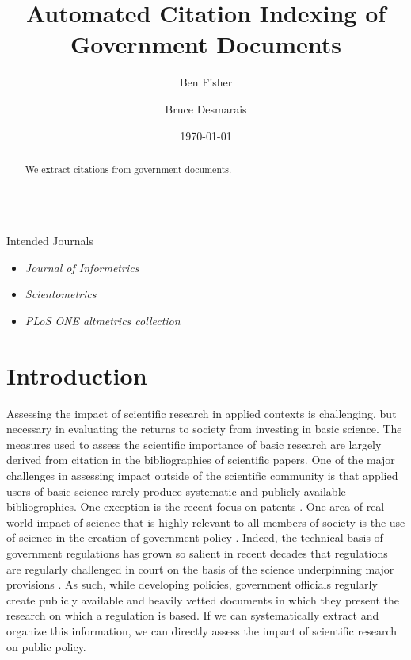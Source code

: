 \documentclass[12pt]{article}
\title{\vspace{-2cm} Automated Citation Indexing of Government Documents}
\author{ Ben Fisher \and Bruce Desmarais} \date{\today}
\begin{document}
\maketitle


\begin{abstract}

 \noindent  We extract citations from government documents. \\~\\

\end{abstract}

Intended Journals \begin{itemize}
\item {\em Journal of Informetrics}
\item {\em Scientometrics}
\item {\em PLoS ONE altmetrics collection}
\end{itemize}

\thispagestyle{empty}
\newpage
\doublespacing


\section{Introduction}
Assessing the impact of scientific research in applied contexts is challenging, but necessary in evaluating the returns to society from investing in basic science. The measures used to assess the scientific importance of basic research are largely derived from citation in the bibliographies of scientific papers. One of the major challenges in assessing impact outside of the scientific community is that applied users of basic science rarely produce systematic and publicly available bibliographies. One exception is the recent focus on patents \cite{huang2014,liaw2014,huang2015,wong2015}. One area of real-world impact of science that is highly relevant to all members of society is the use of science in the creation of government policy \cite{nrc2012}. Indeed, the technical basis of government regulations has grown so salient in recent decades that regulations are regularly challenged in court on the basis of the science underpinning major provisions \cite{ellig2013,morrall2014}. As such, while developing policies, government officials regularly create publicly available and heavily vetted documents in which they present the research on which a regulation is based. If we can systematically extract and organize this information, we can directly assess the impact of scientific research on public policy.
\end{document}
